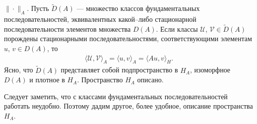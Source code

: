 \documentclass{report}
\begin{document}
$\|\cdot\|_A$. Пусть $\tilde{D}(A)$ --- множество классов фундаментальных последовательностей, эквивалентных какой--либо стационарной последовательности элементов множества $D(A)$. Если
классы $\mathcal{U}$, $\mathcal{V}\in \tilde{D}(A)$ порождены стационарными последовательностями, соответствующими элементам $u$, $v\in D(A)$, то
\begin{gather*}
\langle\mathcal{U},\mathcal{V}\rangle_A=\langle u,v\rangle_A=\langle Au,v\rangle_H.
\end{gather*}
Ясно, что $\tilde{D}(A)$ представляет собой подпространство в $H_A$, изоморфное $D(A)$ и плотное в $H_A$. Пространство $H_A$ описано.

Следует заметить, что с классами фундаментальных последовательностей работать неудобно. Поэтому дадим другое, более удобное, описание пространства $H_A$.
\end{document}
